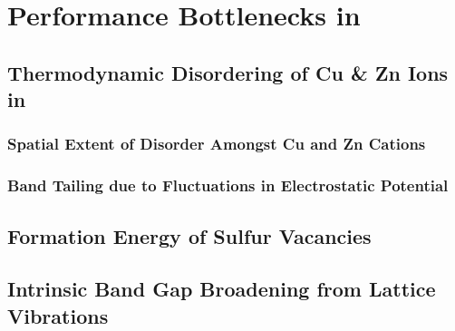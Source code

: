 \chapter{Performance Bottlenecks in \CZTS}

\section{Thermodynamic Disordering of Cu \& Zn Ions in \CZTS}
\subsection{Spatial Extent of Disorder Amongst Cu and Zn Cations}
\subsection{Band Tailing due to Fluctuations in Electrostatic Potential}

\section{Formation Energy of Sulfur Vacancies}
\section{Intrinsic Band Gap Broadening from Lattice Vibrations}
 

